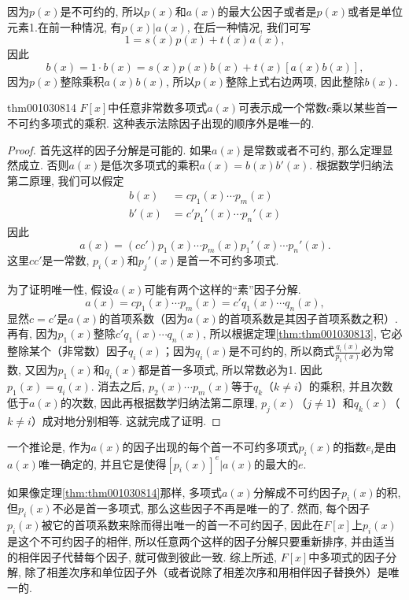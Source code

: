 因为$p(x)$是不可约的, 所以$p(x)$和$a(x)$的最大公因子或者是$p(x)$或者是单位元素1.在前一种情况, 有$p(x)|a(x)$, 在后一种情况, 我们可写
\[
1 = s(x)p(x)+t(x)a(x),
\]
因此
\[
b(x)=1\cdot b(x) = s(x)p(x)b(x)+t(x)[a(x)b(x)],
\]
因为$p(x)$整除乘积$a(x)b(x)$, 所以$p(x)$整除上式右边两项, 因此整除$b(x)$. 

\begin{theorem}{}{thm001030814}
$F[x]$中任意非常数多项式$a(x)$可表示成一个常数$c$乘以某些首一不可约多项式的乘积. 这种表示法除因子出现的顺序外是唯一的. 
\end{theorem}

\begin{proof}
首先这样的因子分解是可能的. 如果$a(x)$是常数或者不可约, 那么定理显然成立. 否则$a(x)$是低次多项式的乘积$a(x)=b(x)b'(x)$. 根据数学归纳法第二原理, 我们可以假定
\[
\begin{aligned}
b(x)&=cp_1(x)\cdots p_m(x)\\
b'(x)&=c'p_1'(x)\cdots p_n'(x)
\end{aligned}
\]
因此
\[
a(x)=(cc')p_1(x)\cdots p_m(x)p_1'(x)\cdots p_n'(x).
\]
这里$cc'$是一常数, $p_i(x)$和$p_j'(x)$是首一不可约多项式. 


为了证明唯一性, 假设$a(x)$可能有两个这样的“素”因子分解. 
\[
a(x)=cp_1(x)\cdots p_m(x)=c'q_1(x) \cdots q_n(x),
\]
显然$c=c'$是$a(x)$的首项系数（因为$a(x)$的首项系数是其因子首项系数之积）. 再有, 因为$p_1(x)$整除$c'q_1(x)\cdots{}q_n(x)$, 所以根据定理\ref{thm:thm001030813}, 它必整除某个（非常数）因子$q_i(x)$；因为$q_i(x)$是不可约的, 所以商式$\frac{q_i(x)}{p_1(x)}$必为常数, 又因为$p_1(x)$和$q_i(x)$都是首一多项式, 所以常数必为1. 因此$p_1(x)=q_i(x)$. 消去之后, $p_2(x)\cdots p_m(x)$等于$q_k$（$k \neq i$）的乘积, 并且次数低于$a(x)$的次数, 因此再根据数学归纳法第二原理, $p_j(x)$（$j \neq 1$）和$q_k(x)$（$k \neq i$）成对地分别相等. 这就完成了证明. 
\end{proof}

一个推论是, 作为$a(x)$的因子出现的每个首一不可约多项式$p_i(x)$的指数$e_i$是由$a(x)$唯一确定的, 并且它是使得$[p_i(x)]^e|a(x)$的最大的$e$. 

如果像定理\ref{thm:thm001030814}那样, 多项式$a(x)$分解成不可约因子$p_i(x)$的积, 但$p_i(x)$不必是首一多项式, 那么这些因子不再是唯一的了. 然而, 每个因子$p_i(x)$被它的首项系数来除而得出唯一的首一不可约因子, 因此在$F[x]$上$p_i(x)$是这个不可约因子的相伴, 所以任意两个这样的因子分解只要重新排序, 并由适当的相伴因子代替每个因子, 就可做到彼此一致. 综上所述, $F[x]$中多项式的因子分解, 除了相差次序和单位因子外（或者说除了相差次序和用相伴因子替换外）是唯一的. 



